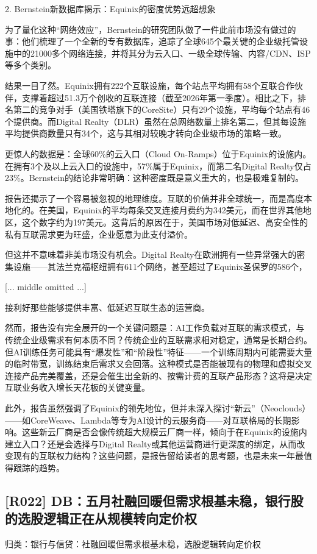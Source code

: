 \documentclass[11pt]{ctexart}
\begin{document}
2. Bernstein新数据库揭示：Equinix的密度优势远超想象

为了量化这种“网络效应”，Bernstein的研究团队做了一件此前市场没有做过的事：他们梳理了一个全新的专有数据库，追踪了全球645个最关键的企业级托管设施中的21000多个网络连接，并将其分为云入口、一级全球传输、内容/CDN、ISP等多个类别。

结果一目了然。Equinix拥有222个互联设施，每个站点平均拥有58个互联合作伙伴，支撑着超过51.3万个创收的互联连接（截至2026年第一季度）。相比之下，排名第二的竞争对手（美国铁塔旗下的CoreSite）只有29个设施，平均每个站点有46个提供商。而Digital Realty（DLR）虽然在总网络数量上排名第二，但其每设施平均提供商数量只有34个，这与其相对较晚才转向企业级市场的策略一致。

更惊人的数据是：全球60\%的云入口（Cloud On-Ramps）位于Equinix的设施内。在拥有3个及以上云入口的设施中，57\%属于Equinix，而第二名Digital Realty仅占23\%。Bernstein的结论非常明确：这种密度既是意义重大的，也是极难复制的。

报告还揭示了一个容易被忽视的地理维度。互联的价值并非全球统一，而是高度本地化的。在美国，Equinix的平均每条交叉连接月费约为342美元，而在世界其他地区，这个数字约为197美元。这背后的原因在于，美国市场对低延迟、高安全性的私有互联需求更为旺盛，企业愿意为此支付溢价。

但这并不意味着非美市场没有机会。Digital Realty在欧洲拥有一些异常强大的密集设施——其法兰克福枢纽拥有611个网络，甚至超过了Equinix圣保罗的586个，

[... middle omitted ...]

接利好那些能够提供丰富、低延迟互联生态的运营商。

然而，报告没有完全展开的一个关键问题是：AI工作负载对互联的需求模式，与传统企业级需求有何本质不同？传统企业的互联需求相对稳定，通常是长期合约。但AI训练任务可能具有“爆发性”和“阶段性”特征——一个训练周期内可能需要大量的临时带宽，训练结束后需求又会回落。这种模式是否能被现有的物理和虚拟交叉连接产品完美覆盖，还是会催生出全新的、按需计费的互联产品形态？这将是决定互联业务收入增长天花板的关键变量。

此外，报告虽然强调了Equinix的领先地位，但并未深入探讨“新云”（Neoclouds）——如CoreWeave、Lambda等专为AI设计的云服务商——对互联格局的长期影响。这些新云厂商是否会像传统超大规模云厂商一样，倾向于在Equinix的设施内建立入口？还是会选择与Digital Realty或其他运营商进行更深度的绑定，从而改变现有的互联权力结构？这些问题，是报告留给读者的思考题，也是未来一年最值得跟踪的趋势。

\subsection{[R022] DB：五月社融回暖但需求根基未稳，银行股的选股逻辑正在从规模转向定价权}
{\small\color{refgray}归类：银行与信贷：社融回暖但需求根基未稳，选股逻辑转向定价权}
\end{document}
